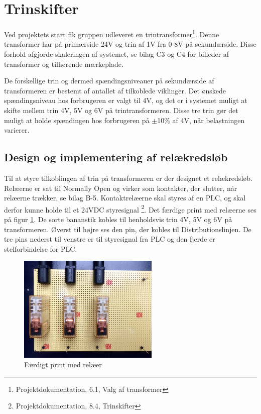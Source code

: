 
\section{Trinskifter}
\label{sec:relae}
Ved projektets start fik gruppen udleveret en trintransformer\footnote{Projektdokumentation, 6.1, Valg af transformer}. Denne transformer har på primærside 24V og trin af 1V fra 0-8V på sekundærside. Disse forhold afgjorde skaleringen af systemet, se bilag C3 og C4 for billeder af transformer og tilhørende mærkeplade. 

De forskellige trin og dermed spændingsniveauer på sekundærside af transformeren er bestemt af antallet af tilkoblede viklinger. Det ønskede spændingsniveau hos forbrugeren er valgt til 4V, og det er i systemet muligt at skifte mellem trin 4V, 5V og 6V på trintransformeren. Disse tre trin gør det muligt at holde spændingen hos forbrugeren på $\pm$10$\%$ af 4V, når belastningen varierer.

\subsection{Design og implementering af relækredsløb}
Til at styre tilkoblingen af trin på transformeren er der designet et relækredsløb. Relæerne er sat til Normally Open og virker som kontakter, der slutter, når relæerne trækker, se bilag B-5. Kontaktrelæerne skal styres af en PLC, og skal derfor kunne holde til et 24VDC styresignal \footnote{Projektdokumentation, 8.4, Trinskifter}. Det færdige print med relæerne ses på figur \ref{fig:Relae}. De sorte bananstik kobles til henholdsvis trin 4V, 5V og 6V på transformeren. Øverst til højre ses den pin, der kobles til Distributionslinjen. De tre pins nederst til venstre er til styresignal fra PLC og den fjerde er stelforbindelse for PLC. 

\begin{figure}[H]
	\centering
	\includegraphics[width=0.6\textwidth]{figure/Relaekredsl}
	\caption{Færdigt print med relæer}
	\label{fig:Relae}
\end{figure}

